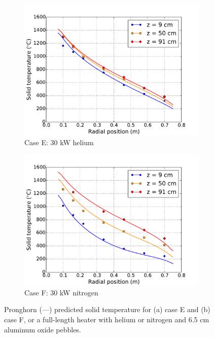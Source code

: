 \begin{figure}[h!]
    \begin{subfigure}{0.5\linewidth}
        \centering
        \includegraphics[height=0.75\linewidth]{figs/exp_total_D2.pdf}
       \caption{Case E: 30 \si{\kilo\watt} helium}
    \end{subfigure}
    \begin{subfigure}{0.5\linewidth}
        \centering
        \includegraphics[height=0.75\linewidth]{figs/exp_total_J2.pdf}
        \caption{Case F: 30 \si{\kilo\watt} nitrogen}
    \end{subfigure}
    \caption{Pronghorn (---) predicted solid temperature for (a) case E and (b) case F, or a full-length heater with helium or nitrogen and 6.5 \si{\centi\meter} aluminum oxide pebbles.}
    \label{fig:long65}
\end{figure}

